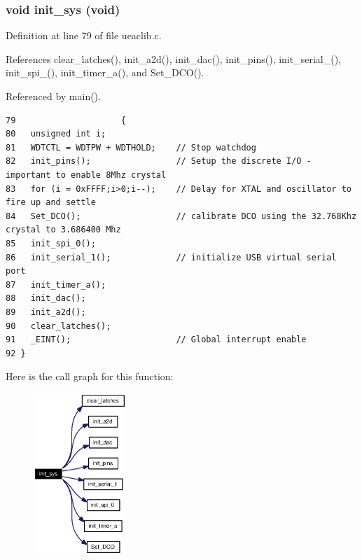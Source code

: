 \subsubsection{\setlength{\rightskip}{0pt plus 5cm}void init\_\-sys (void)}\label{ueaclib_8c_a13}




Definition at line 79 of file ueaclib.c.

References clear\_\-latches(), init\_\-a2d(), init\_\-dac(), init\_\-pins(), init\_\-serial\_(), init\_\-spi\_(), init\_\-timer\_\-a(), and Set\_\-DCO().

Referenced by main().

\footnotesize\begin{verbatim}79                     {
80   unsigned int i;
81   WDTCTL = WDTPW + WDTHOLD;    // Stop watchdog
82   init_pins();                 // Setup the discrete I/O - important to enable 8Mhz crystal 
83   for (i = 0xFFFF;i>0;i--);    // Delay for XTAL and oscillator to fire up and settle
84   Set_DCO();                   // calibrate DCO using the 32.768Khz crystal to 3.686400 Mhz  
85   init_spi_0();
86   init_serial_1();             // initialize USB virtual serial port
87   init_timer_a();              
88   init_dac();
89   init_a2d();
90   clear_latches();
91   _EINT();                     // Global interrupt enable
92 }
\end{verbatim}\normalsize 




Here is the call graph for this function:\begin{figure}[H]
\begin{center}
\leavevmode
\includegraphics[width=99pt]{ueaclib_8c_a13_cgraph}
\end{center}
\end{figure}

